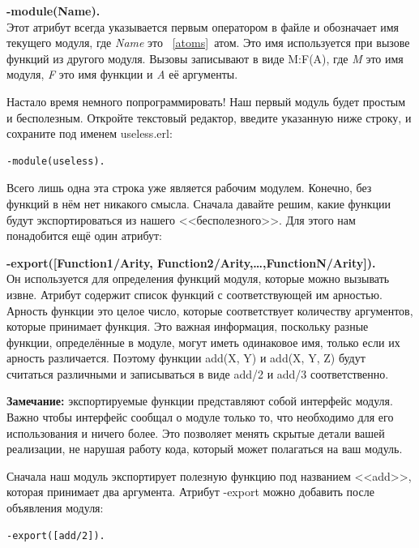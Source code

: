 \documentclass[a4paper,12pt]{report}
\newcommand{\ops}{\colorbox{lgreen}}
\begin{document}
\begin{minipage}{1\linewidth}
    \textbf{-module(Name).}\\ 
    Этот атрибут всегда указывается первым оператором в файле и обозначает имя текущего модуля, где \emph{Name} это ~\ref{atoms}{~атом}. Это имя используется при вызове функций из другого модуля. Вызовы записывают в виде \ops{M:F(A)}, где \emph{M} это имя модуля, \emph{F} это имя функции и \emph{A} её аргументы.
\end{minipage}

Настало время немного попрограммировать! Наш первый модуль будет простым и бесполезным. Откройте текстовый редактор, введите указанную ниже строку, и сохраните под именем \ops{useless.erl}:
\begin{lstlisting}[style=repl]
-module(useless).
\end{lstlisting}

Всего лишь одна эта строка уже является рабочим модулем. Конечно, без функций в нём нет никакого смысла. Сначала давайте решим, какие функции будут экспортироваться из нашего <<бесполезного>>. Для этого нам понадобится ещё один атрибут:

\begin{minipage}{1.0\linewidth}
    \textbf{-export([Function1/Arity, Function2/Arity,\ldots,FunctionN/Arity]).}\\ 
    Он используется для определения функций модуля, которые можно вызывать извне. Атрибут содержит список функций с соответствующей им арностью. Арность функции это целое число, которые соответствует количеству аргументов, которые принимает функция. Это важная информация, поскольку разные функции, определённые в модуле, могут иметь одинаковое имя, только если их арность различается. Поэтому функции \ops{add(X, Y)} и \ops{add(X, Y, Z)} будут считаться различными и записываться в виде \ops{add/2} и \ops{add/3} соответственно.
\end{minipage}

\colorbox{lgray}{
    \begin{minipage}{1\linewidth}
                \textbf{Замечание:} экспортируемые функции представляют собой интерфейс модуля. Важно чтобы интерфейс сообщал о модуле только то, что необходимо для его использования и ничего более. Это позволяет менять скрытые детали вашей реализации, не нарушая работу кода, который может полагаться на ваш модуль.
    \end{minipage}
}

Сначала наш модуль экспортирует полезную функцию под названием <<add>>, которая принимает два аргумента. Атрибут \ops{-export} можно добавить после объявления модуля:
\begin{lstlisting}[style=repl]
-export([add/2]).
\end{lstlisting}
\end{document}
